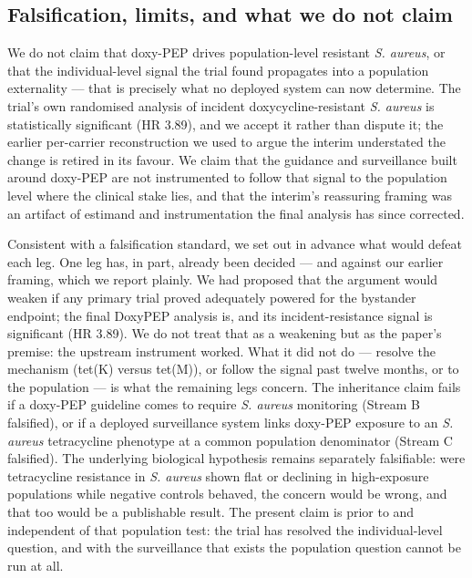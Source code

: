 \documentclass[10pt,letterpaper]{article}
\begin{document}
\subsection*{Falsification, limits, and what we do not claim}

We do not claim that doxy-PEP drives population-level resistant \emph{S.
aureus}, or that the individual-level signal the trial found propagates
into a population externality --- that is precisely what no deployed
system can now determine. The trial's own randomised analysis of
incident doxycycline-resistant \emph{S. aureus} is statistically
significant (HR 3.89), and we accept it rather than dispute it; the
earlier per-carrier reconstruction we used to argue the interim
understated the change is retired in its favour. We claim that the
guidance and surveillance built around doxy-PEP are not instrumented to
follow that signal to the population level where the clinical stake
lies, and that the interim's reassuring framing was an artifact of
estimand and instrumentation the final analysis has since corrected.

Consistent with a falsification standard, we set out in advance what
would defeat each leg. One leg has, in part, already been decided ---
and against our earlier framing, which we report plainly. We had
proposed that the argument would weaken if any primary trial proved
adequately powered for the bystander endpoint; the final DoxyPEP
analysis is, and its incident-resistance signal is significant (HR
3.89). We do not treat that as a weakening but as the paper's premise:
the upstream instrument worked. What it did not do --- resolve the
mechanism (tet(K) versus tet(M)), or follow the signal past twelve
months, or to the population --- is what the remaining legs concern. The
inheritance claim fails if a doxy-PEP guideline comes to require
\emph{S. aureus} monitoring (Stream B falsified), or if a deployed
surveillance system links doxy-PEP exposure to an \emph{S. aureus}
tetracycline phenotype at a common population denominator (Stream C
falsified). The underlying biological hypothesis remains separately
falsifiable: were tetracycline resistance in \emph{S. aureus} shown flat
or declining in high-exposure populations while negative controls
behaved, the concern would be wrong, and that too would be a publishable
result. The present claim is prior to and independent of that population
test: the trial has resolved the individual-level question, and with the
surveillance that exists the population question cannot be run at all.
\end{document}

